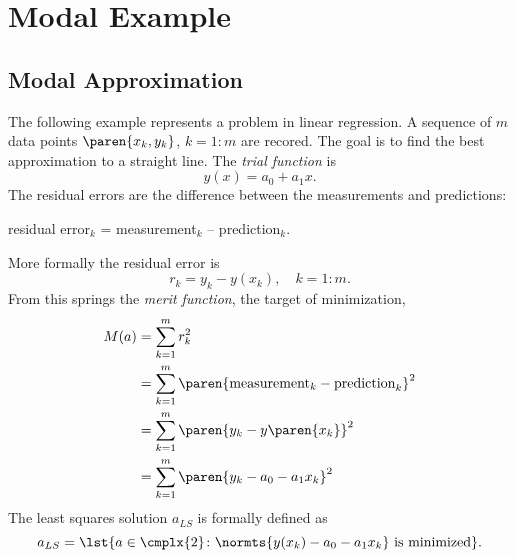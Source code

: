 \chapter{\label{ch:archetype modal}Modal Example}

\section{\label{sec:modal problem}Modal Approximation}  %
The following example represents a problem in linear regression. A sequence of $m$ data points $\paren{x_{k}, y_{k}}$, $k=1\colon m$ are recored. The goal is to find the best approximation to a straight line. The \emph{trial function} is
  \begin{equation*}   %
    y(x) = a_{0} + a_{1} x .
    \label{eq:lr trial}
  \end{equation*}
The residual errors are the difference between the measurements and predictions:\\
\begin{center}
residual error$_{k}$ = measurement$_{k}$ -- prediction$_{k}$.
\end{center} 
 More formally the residual error is
  \begin{equation*}   %
    r_{k} = y_{k} - y(x_{k}), \quad k=1\colon m.
  \end{equation*}
From this springs the \emph{merit function}, the target of minimization,
  \begin{equation*}   %
  \begin{split}
    M(a) 
      &= \sum_{k=1}^{m} r_{k}^{2} \\
      &= \sum_{k=1}^{m} \paren{\text{measurement}_{k} - \text{prediction}_{k}}^{2} \\
      &= \sum_{k=1}^{m} \paren{y_{k} - y\paren{x_{k}}}^{2} \\
      &= \sum_{k=1}^{m} \paren{y_{k} - a_{0} - a_{1} x_{k}}^{2}
    \label{eqn:merit}
  \end{split}
  \end{equation*}
The least squares solution $a_{LS}$ is formally defined as 
  \begin{equation}   %
    a_{LS} = \lst{a \in \cmplx{2} \colon \normts{y(x_{k}) - a_{0} - a_{1} x_{k}} \text{ is minimized} }.
    \label{eq:gradient lr}
  \end{equation}

